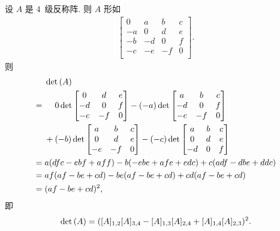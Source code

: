 \documentclass[../libro.tex]{subfiles}
\begin{document}
\begin{example}
    设 \(A\) 是 \(4\)~级反称阵.
    则 \(A\) 形如
    \begin{align*}
        \begin{bmatrix}
            0  & a  & b  & c \\
            -a & 0  & d  & e \\
            -b & -d & 0  & f \\
            -c & -e & -f & 0 \\
        \end{bmatrix}.
    \end{align*}
    则
    \begin{align*}
        & \det {(A)}
        \\
        = {} &
        \hphantom{{} + {}}
        0 \det {
            \begin{bmatrix}
                0  & d  & e \\
                -d & 0  & f \\
                -e & -f & 0 \\
            \end{bmatrix}
        }
        - (-a)
        \det {
            \begin{bmatrix}
                a  & b  & c \\
                -d & 0  & f \\
                -e & -f & 0 \\
            \end{bmatrix}
        }
        \\
        &
        + (-b) \det {
            \begin{bmatrix}
                a  & b  & c \\
                0  & d  & e \\
                -e & -f & 0 \\
            \end{bmatrix}
        }
        - (-c) \det {
            \begin{bmatrix}
                a  & b & c \\
                0  & d & e \\
                -d & 0 & f \\
            \end{bmatrix}
        }
        \\
        = {} &
        a (dfc - ebf + aff)
        - b (-ebe + afe + edc)
        + c (adf - dbe + ddc)
        \\
        = {} &
        af (af - be + cd)
        - be (af - be + cd)
        + cd (af - be + cd)
        \\
        = {} & (af - be + cd)^2,
    \end{align*}
    即
    \begin{equation*}
        \det {(A)}
        = ([A]_{1,2} [A]_{3,4} - [A]_{1,3} [A]_{2,4}
        + [A]_{1,4} [A]_{2,3})^2.
        \qedhere
    \end{equation*}
\end{example}
\end{document}
